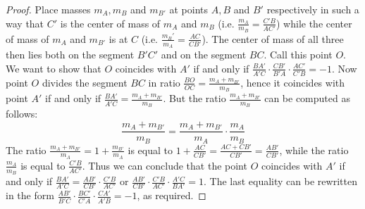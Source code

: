 \begin{proof}
Place masses $m_A,m_B$ and $m_{B'}$ at points $A,B$ and $B'$ respectively in such a way that $C'$ is the center of mass of $m_A$ and $m_B$ (i.e. $\frac{m_A}{m_B}=\frac{C'B}{AC'}$) while the center of mass of $m_A$ and $m_{B'}$ is at $C$ (i.e. $\frac{m_B'}{m_A}=\frac{AC}{CB'}$).
The center of mass of all three then lies both on the segment $B'C'$ and on the segment $BC$. Call this point $O$.
We want to show that $O$ coincides with $A'$ if and only if $\frac{BA'}{A'C}\cdot\frac{CB'}{B'A}\cdot\frac{AC'}{C'B}=-1$.
Now point $O$ divides the segment $BC$ in ratio $\frac{BO}{OC}=\frac{m_A+m_{B'}}{m_B}$, hence it coincides with point $A'$ if and only if $\frac{BA'}{A'C}=\frac{m_A+m_{B'}}{m_B}$. But the ratio $\frac{m_A+m_{B'}}{m_B}$ can be computed as follows: $$\frac{m_A+m_{B'}}{m_B}=\frac{m_A+m_{B'}}{m_A}\cdot \frac{m_A}{m_B}$$
The ratio $\frac{m_A+m_{B'}}{m_A}=1+\frac{m_{B'}}{m_A}$ is equal to $1+\frac{AC}{CB'}=\frac{AC+CB'}{CB'}=\frac{AB'}{CB'}$, while the ratio $\frac{m_A}{m_B}$ is equal to $\frac{C'B}{AC'}$. Thus we can conclude that the point $O$ coincides with $A'$ if and only if $\frac{BA'}{A'C}=\frac{AB'}{CB'}\cdot\frac{C'B}{AC'}$ or $\frac{AB'}{CB'}\cdot\frac{C'B}{AC'}\cdot\frac{A'C}{BA'}=1$. The last equality can be rewritten in the form $\frac{AB'}{B'C}\cdot\frac{BC'}{C'A}\cdot\frac{CA'}{A'B}=-1$, as required.
\end{proof}

